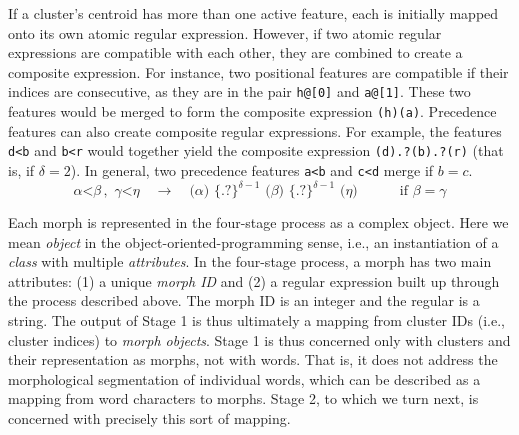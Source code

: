 
If a cluster's centroid has more than one active feature, each
is initially mapped onto its own atomic regular expression.
However, if two atomic regular expressions are compatible with each other, %
they are combined to create a composite expression. For instance, two 
positional features are compatible if their indices are consecutive, 
as they are in the pair \texttt{h@[0]} and \texttt{a@[1]}. These two features would be
merged
to form the composite expression \texttt{(h)(a)}. Precedence features 
can also create composite regular expressions. For example, the 
features \texttt{d<b} and \texttt{b<r} would together yield the 
composite expression \texttt{(d).?(b).?(r)} (that is, if $\delta = 2$). 
In general, two precedence features \texttt{a<b} and \texttt{c<d} 
merge if $b=c$.
\begin{equation}
\alpha\texttt{<} \beta \, ,\,\, \gamma \texttt{<} \eta  \quad \to \quad \texttt{(} \alpha \texttt{)}  \,\, 
{\{\texttt{.?}\}}^{\delta-1} \,\, \texttt{(}\beta \texttt{)} \,\,{\{\texttt{.?}\}}^{\delta-1} \, \, \texttt{(} \eta \texttt{)} \qquad \quad \text{if $\beta = \gamma$} 
\end{equation}

Each morph is represented in the four-stage process as a complex object. Here 
we mean \emph{object} in the object-oriented-programming sense, i.e., an instantiation of a \emph{class} with multiple \emph{attributes}.
In the four-stage process, a morph has two main attributes: (1) a unique \emph{morph ID} and (2) a regular expression built up through the process described above. The morph ID is an integer and the regular is a string. 
The output of Stage 1 is thus ultimately a mapping from cluster IDs (i.e., cluster indices) to \emph{morph objects}.
Stage 1 is thus concerned only with clusters and their representation as morphs, not with words. That is,
it does not address the morphological segmentation of individual words, which can
be described as a mapping from word characters to morphs.
  Stage 2, to which we turn next, is concerned with precisely this sort of mapping.


